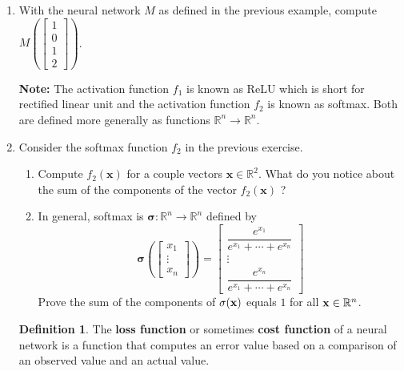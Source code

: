 \documentclass[12pt]{amsart}
\newcommand{\R}{\mathbb{R}}
\theoremstyle{definition}
\newtheorem*{definition}{Definition}
\begin{document}
\vspace{.5em}
\begin{enumerate}[itemsep=2.5em,leftmargin=0pt]

\item With the neural network $M$ as defined in the previous example, compute $M\left(\left[\begin{array}{c} 1 \\ 0 \\ 1 \\ 2 \end{array}\right]\right)$.

\vspace{1em}

\noindent \textbf{Note:} The activation function $f_1$ is known as ReLU which is short for rectified linear unit and the activation function $f_2$ is known as softmax. Both are defined more generally as functions $\R^n\to\R^n$.

\vspace{-2em}

\item Consider the softmax function $f_2$ in the previous exercise.
\begin{enumerate}[label=(\alph*),itemsep=.5em]
    \item Compute $f_2(\mathbf{x})$ for a couple vectors $\mathbf{x}\in\R^2$. What do you notice about the sum of the components of the vector $f_2(\mathbf{x})$ ?
    \item In general, softmax is $\mathbf{\sigma}:\R^n\to\R^n$ defined by 
    \[
        \mathbf{\sigma}\left(\left[\begin{array}{c} x_1 \\ \vdots \\ x_n \end{array}\right]\right)= \left[\begin{array}{c} \dfrac{e^{x_1}}{e^{x_1}+\cdots +e^{x_n}} \\ \vdots \\ \dfrac{e^{x_n}}{e^{x_1}+\cdots +e^{x_n}} \end{array}\right]
    \]
    Prove the sum of the components of $\mathbf{\sigma}({\bf x})$ equals $1$ for all ${\bf x}\in \R^n$.
\end{enumerate}


\begin{definition}
    The \textbf{loss function} or sometimes \textbf{cost function} of a neural network is a function that computes an error value based on a comparison of an observed value and an actual value.
\end{definition}


\end{enumerate}
\end{document}

